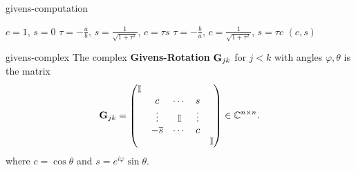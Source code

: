 \begin{Algorithm}{givens-computation}
  \begin{algorithmic}[1]
    \State $c=1$, $s=0$
    \Else
    \State $\tau=-\frac ab$, $s=\frac1{\sqrt{1+\tau^2}}$, $c=\tau s$
    \Else
    \State $\tau=-\frac ba$, $c=\frac1{\sqrt{1+\tau^2}}$, $s=\tau c$
    \EndIf
    \EndIf
    \State \Return $(c,s)$
    \EndFunction
  \end{algorithmic}
\end{Algorithm}

\begin{Definition}{givens-complex}
  The complex \textbf{Givens-Rotation} $\mathbf G_{jk}$ for $j<k$ with angles $\varphi,\theta$ is the matrix
  \begin{gather}
      \mathbf G_{jk} =
    \begin{pmatrix}
      \mathbb I \\
      &c&\cdots&s\\
      &\vdots&\mathbb I &\vdots\\
      &-\overline s&\cdots&c\\
      &&&&\mathbb I
    \end{pmatrix}
    \in\mathbb C^{n\times n}.
  \end{gather}
    where $c = \cos\theta$ and $s = e^{i\varphi}\sin\theta$.
\end{Definition}

